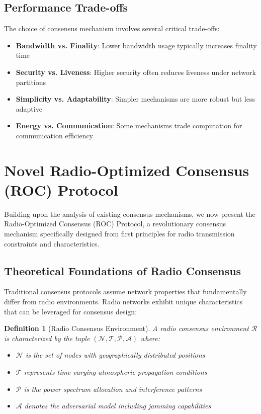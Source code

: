 \documentclass[11pt,a4paper]{article}
\newtheorem{definition}[theorem]{Definition}
\begin{document}
\subsection{Performance Trade-offs}

The choice of consensus mechanism involves several critical trade-offs:

\begin{itemize}
\item \textbf{Bandwidth vs. Finality}: Lower bandwidth usage typically increases finality time
\item \textbf{Security vs. Liveness}: Higher security often reduces liveness under network partitions  
\item \textbf{Simplicity vs. Adaptability}: Simpler mechanisms are more robust but less adaptive
\item \textbf{Energy vs. Communication}: Some mechanisms trade computation for communication efficiency
\end{itemize}

\section{Novel Radio-Optimized Consensus (ROC) Protocol}

Building upon the analysis of existing consensus mechanisms, we now present the Radio-Optimized Consensus (ROC) Protocol, a revolutionary consensus mechanism specifically designed from first principles for radio transmission constraints and characteristics.

\subsection{Theoretical Foundations of Radio Consensus}

Traditional consensus protocols assume network properties that fundamentally differ from radio environments. Radio networks exhibit unique characteristics that can be leveraged for consensus design:

\begin{definition}[Radio Consensus Environment]
A radio consensus environment $\mathcal{R}$ is characterized by the tuple $(\mathcal{N}, \mathcal{T}, \mathcal{P}, \mathcal{A})$ where:
\begin{itemize}
\item $\mathcal{N}$ is the set of nodes with geographically distributed positions
\item $\mathcal{T}$ represents time-varying atmospheric propagation conditions
\item $\mathcal{P}$ is the power spectrum allocation and interference patterns  
\item $\mathcal{A}$ denotes the adversarial model including jamming capabilities
\end{itemize}
\end{definition}
\end{document}
